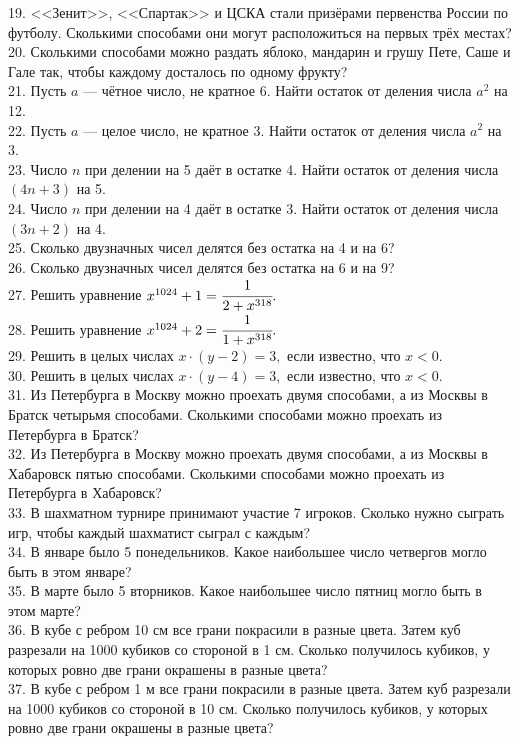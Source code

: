 \documentclass[12pt]{article}
\begin{document}
19. <<Зенит>>, <<Спартак>> и ЦСКА стали призёрами первенства России по футболу. Сколькими способами они могут расположиться на первых трёх местах?\\
20. Сколькими способами можно раздать яблоко, мандарин и грушу Пете, Саше и Гале так, чтобы каждому досталось по одному фрукту?\\
21. Пусть $a$ --- чётное число, не кратное 6. Найти остаток от деления числа $a^2$ на 12.\\
22. Пусть $a$ --- целое число, не кратное 3. Найти остаток от деления числа $a^2$ на 3.\\
23. Число $n$ при делении на 5 даёт в остатке 4. Найти остаток от деления числа $(4n+3)$ на 5.\\
24. Число $n$ при делении на 4 даёт в остатке 3. Найти остаток от деления числа $(3n+2)$ на 4.\\
25. Сколько двузначных чисел делятся без остатка на 4 и на 6?\\
26. Сколько двузначных чисел делятся без остатка на 6 и на 9?\\
27. Решить уравнение $x^{1024}+1=\cfrac{1}{2+x^{318}}.$\\
28. Решить уравнение $x^{1024}+2=\cfrac{1}{1+x^{318}}.$\\
29. Решить в целых числах $x\cdot (y-2)=3,$ если известно, что $x<0.$\\
30. Решить в целых числах $x\cdot (y-4)=3,$ если известно, что $x<0.$\\
31. Из Петербурга в Москву можно проехать двумя способами, а из Москвы в Братск четырьмя способами. Сколькими способами можно проехать из Петербурга в Братск?\\
32. Из Петербурга в Москву можно проехать двумя способами, а из Москвы в Хабаровск пятью способами. Сколькими способами можно проехать из Петербурга в Хабаровск?\\
33. В шахматном турнире принимают участие 7 игроков. Сколько нужно сыграть игр, чтобы каждый шахматист сыграл с каждым?\\
34. В январе было 5 понедельников. Какое наибольшее число четвергов могло быть в этом январе?\\
35. В марте было 5 вторников. Какое наибольшее число пятниц могло быть в этом марте?\\
36. В кубе с ребром 10 см все грани покрасили в разные цвета. Затем куб разрезали на 1000 кубиков со стороной в 1 см. Сколько получилось кубиков, у которых ровно две грани окрашены в разные цвета?\\
37. В кубе с ребром 1 м все грани покрасили в разные цвета. Затем куб разрезали на 1000 кубиков со стороной в 10 см. Сколько получилось кубиков, у которых ровно две грани окрашены в разные цвета?\\
\end{document}
